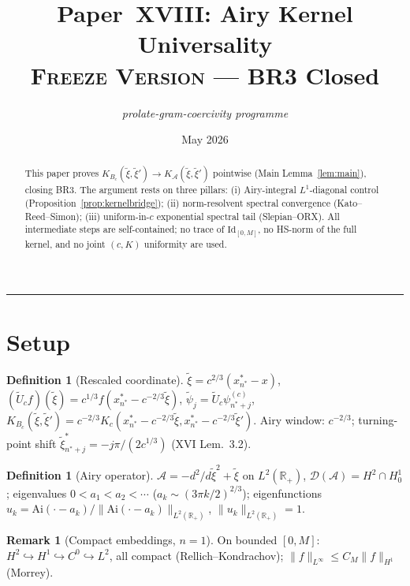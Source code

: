\documentclass[12pt,a4paper]{amsart}
\theoremstyle{definition}
\newtheorem{definition}[theorem]{Definition}
\newtheorem{remark}[theorem]{Remark}
\newcommand{\cA}{\mathcal{A}}
\newcommand{\R}{\mathbb{R}}
\newcommand{\cK}{K_{B_c}}
\newcommand{\cKA}{K_{\cA}}
\newcommand{\Ai}{\mathrm{Ai}}
\newcommand{\Uc}{\widetilde{U}_c}
\newcommand{\xit}{\tilde{\xi}}
\newcommand{\normh}[2]{\|#1\|_{#2}}
\begin{document}
\title[Paper XVIII: Airy Universality]{%
  Paper~XVIII: Airy Kernel Universality\\[0.3em]
  \large \textsc{Freeze Version} --- BR3 Closed}

\author{\textit{prolate-gram-coercivity programme}}
\date{May 2026}

\begin{abstract}
This paper proves $\cK(\xit,\xit')\to\cKA(\xit,\xit')$ pointwise
(Main Lemma~\ref{lem:main}), closing BR3.
The argument rests on three pillars:
(i) Airy-integral $L^1$-diagonal control
(Proposition~\ref{prop:kernelbridge});
(ii) norm-resolvent spectral convergence
(Kato--Reed--Simon);
(iii) uniform-in-$c$ exponential spectral tail
(Slepian--ORX).
All intermediate steps are self-contained;
no trace of $\mathrm{Id}_{[0,M]}$,
no HS-norm of the full kernel,
and no joint $(c,K)$ uniformity are used.
\end{abstract}

\maketitle
\tableofcontents
\bigskip\hrule\bigskip

\section{Setup}
\label{sec:setup}

\begin{definition}[Rescaled coordinate]
\label{def:airycoord}
$\xit=c^{2/3}(x_{n^*}^*-x)$,
$(\Uc f)(\xit)=c^{1/3}f(x_{n^*}^*-c^{-2/3}\xit)$,
$\tilde\psi_j=\Uc\psi_{n^*+j}^{(c)}$,
$\cK(\xit,\xit')=c^{-2/3}K_c(x_{n^*}^*-c^{-2/3}\xit,
x_{n^*}^*-c^{-2/3}\xit')$.
Airy window: $c^{-2/3}$;
turning-point shift $\xit_{n^*+j}^*=-j\pi/(2c^{1/3})$ (XVI Lem.~3.2).
\end{definition}

\begin{definition}[Airy operator]
\label{def:airyop}
$\cA=-d^2/d\xit^2+\xit$ on $L^2(\R_+)$,
$\mathcal{D}(\cA)=H^2\cap H^1_0$;
eigenvalues $0<a_1<a_2<\cdots$
($a_k\sim(3\pi k/2)^{2/3}$);
eigenfunctions $u_k=\Ai(\cdot-a_k)/\normh{\Ai(\cdot-a_k)}{L^2(\R_+)}$,
$\normh{u_k}{L^2(\R_+)}=1$.
\end{definition}

\begin{remark}[Compact embeddings, $n=1$]
\label{rem:compact}
On bounded $[0,M]$:
$H^2\hookrightarrow H^1\hookrightarrow C^0\hookrightarrow L^2$,
all compact (Rellich--Kondrachov);
$\normh{f}{L^\infty}\leq C_M\normh{f}{H^1}$ (Morrey).
\end{remark}
\end{document}
